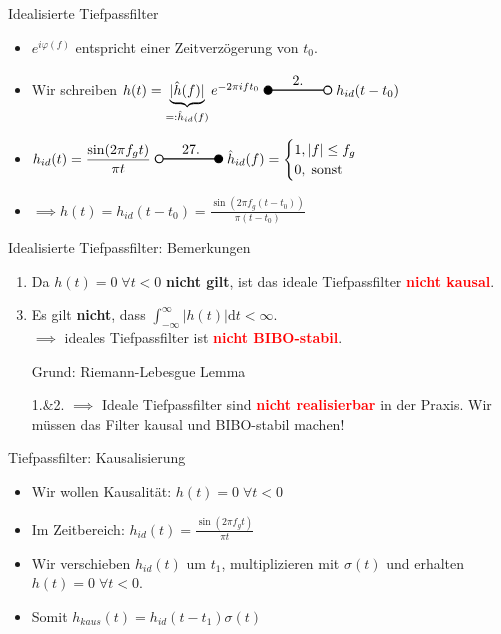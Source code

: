 \documentclass[14pt, aspectratio=169, handout]{beamer}
\newcommand{\transform}[2]{%
    \begin{tikzpicture}
        \draw[thick] (0,0) circle (0.1);
        \draw[thick] (0.1,0) -- (#2,0) node[midway, above] {#1};
        \filldraw[thick] (#2,0) circle (0.1);
    \end{tikzpicture}%
}
\newcommand{\invtransform}[2]{%
    \begin{tikzpicture}
        \filldraw[thick] (0,0) circle (0.1);
        \draw[thick] (0.1,0) -- (#2 -0.1,0) node[midway, above] {#1};
        \draw[thick] (#2,0) circle (0.1);
    \end{tikzpicture}%
}
\begin{document}
\begin{frame}{Idealisierte Tiefpassfilter}
    \begin{itemize}
    \item $e^{i\varphi(f)}$ entspricht einer Zeitverzögerung von $t_0$.
    \item[] 
    \item Wir schreiben $h(t) = \underbrace{|\hat{h}(f)|}_{=:\hat{h}_{id}(f)} e^{-2\pi i f t_0} \; \invtransform{2.}{1.5} \; h_{id}(t-t_0)$
    \item[] 
    \item $h_{id}(t) = \displaystyle\frac{\sin(2 \pi f_g t)}{\pi t} \; \transform{27.}{1.5} \; \hat{h}_{id}(f) = \displaystyle\begin{cases}
        1, |f| \leq f_g\\
        0, \; \text{sonst}
    \end{cases}$ 
    \item[] 
    \item $ \implies h(t) = h_{id}(t-t_0) = \displaystyle\frac{\sin(2 \pi f_g (t-t_0))}{\pi (t-t_0)}$
\end{itemize}
\end{frame}

\begin{frame}{Idealisierte Tiefpassfilter: Bemerkungen}
    \begin{enumerate}
    \item Da $h(t) = 0 \; \forall t < 0$ \textbf{nicht gilt}, ist das ideale Tiefpassfilter \textcolor{red}{\textbf{nicht kausal}}.
    \item[] 
    \item Es gilt \textbf{nicht}, dass $\displaystyle\int_{-\infty}^{\infty} |h(t)|\text{d}t < \infty$. \\$\implies$ ideales Tiefpassfilter ist \textcolor{red}{\textbf{nicht BIBO-stabil}}.
    \item[] Grund: Riemann-Lebesgue Lemma
    \item[] 
    \item[1.\&2.] $\implies$ Ideale Tiefpassfilter sind \textcolor{red}{\textbf{nicht realisierbar}} in der Praxis. Wir müssen das Filter kausal und BIBO-stabil machen!
\end{enumerate}
\end{frame}

\begin{frame}{Tiefpassfilter: Kausalisierung}
    \begin{itemize}
    \item Wir wollen Kausalität: $h(t) = 0 \; \forall t < 0$
    \item[] 
    \item Im Zeitbereich: $h_{id}(t) = \displaystyle\frac{\sin(2 \pi f_g t)}{\pi t}$
    \item[] 
    \item Wir verschieben $h_{id}(t)$ um $t_1$,  multiplizieren mit $\sigma(t)$ und erhalten $h(t) = 0 \; \forall t < 0$.
    \item[] 
    \item Somit $h_{kaus}(t) = h_{id}(t-t_1)\sigma(t)$
    \end{itemize}
\end{frame}
\end{document}
